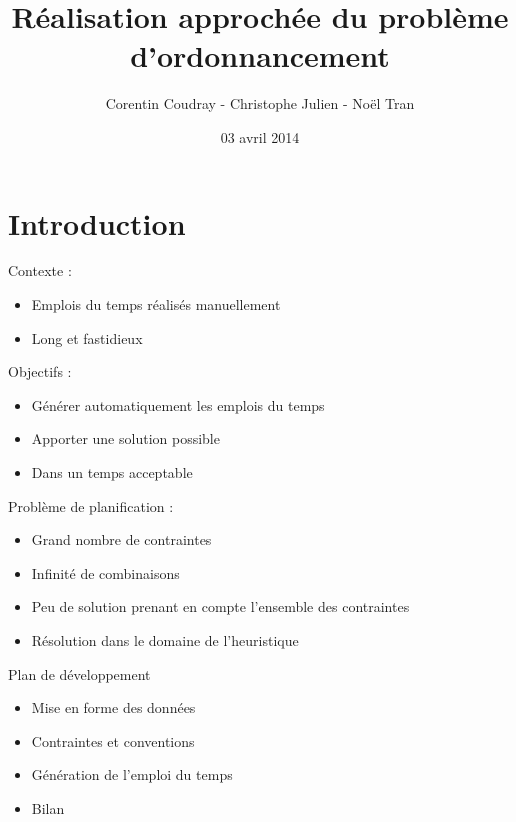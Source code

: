 \documentclass{beamer}
\title{Réalisation approchée du problème d'ordonnancement}
\author{Corentin Coudray - Christophe Julien - Noël Tran}
\institute{ESME SUDRIA}
\date{03 avril 2014}
\begin{document}
\begin{frame}
\titlepage
\end{frame}

\section{Introduction}
\begin{frame}
Contexte : 
\begin{itemize}
\item Emplois du temps réalisés manuellement
\item Long et fastidieux\\
\end{itemize}
\end{frame}

\begin{frame}
Objectifs :
\begin{itemize}
\item Générer automatiquement les emplois du temps
\item Apporter une solution possible
\item Dans un temps acceptable
\end{itemize}
\end{frame}

\begin{frame}
Problème de planification : 
\begin{itemize}
\item Grand nombre de contraintes
\item Infinité de combinaisons
\item Peu de solution prenant en compte l'ensemble des contraintes
\item Résolution dans le domaine de l'heuristique
\end{itemize}
\end{frame}

\begin{frame}
Plan de développement \\
\begin{itemize}
\item Mise en forme des données
\item Contraintes et conventions
\item Génération de l'emploi du temps
\item Bilan
\end{itemize}
\end{frame}
\end{document}
